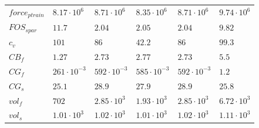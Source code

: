 \begin{tabular}{llllll}
$force_{ptrain}$ & $8.17 \cdot 10^{6}$ & $8.71 \cdot 10^{6}$ & $8.35 \cdot 10^{6}$ & $8.71 \cdot 10^{6}$ & $9.74 \cdot 10^{6}$ \\ 
$FOS_{spar}$ & $11.7 $ & $2.04 $ & $2.05 $ & $2.04 $ & $9.82 $ \\ 
$c_v$ & $101 $ & $86 $ & $42.2 $ & $86 $ & $99.3 $ \\ 
$CB_f$ & $1.27 $ & $2.73 $ & $2.77 $ & $2.73 $ & $5.5 $ \\ 
$CG_f$ & $261 \cdot 10^{-3}$ & $592 \cdot 10^{-3}$ & $585 \cdot 10^{-3}$ & $592 \cdot 10^{-3}$ & $1.2 $ \\ 
$CG_s$ & $25.1 $ & $28.9 $ & $27.9 $ & $28.9 $ & $25.8 $ \\ 
$vol_f$ & $702 $ & $2.85 \cdot 10^{3}$ & $1.93 \cdot 10^{3}$ & $2.85 \cdot 10^{3}$ & $6.72 \cdot 10^{3}$ \\ 
$vol_s$ & $1.01 \cdot 10^{3}$ & $1.02 \cdot 10^{3}$ & $1.01 \cdot 10^{3}$ & $1.02 \cdot 10^{3}$ & $1.11 \cdot 10^{3}$ \\ 
\end{tabular}